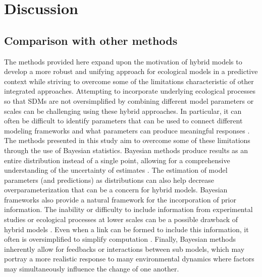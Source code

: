 \documentclass[11pt]{article}
\begin{document}
\section*{Discussion}

\subsection*{Comparison with other methods}
The methods provided here expand upon the motivation of hybrid models to develop a more robust and unifying approach for ecological models in a predictive context while striving to overcome some of the limitations characteristic of other integrated approaches. 
Attempting to incorporate underlying ecological processes so that SDMs are not oversimplified by combining different model parameters or scales can be challenging using these hybrid approaches. 
In particular, it can often be difficult to identify parameters that can be used to connect different modeling frameworks and what parameters can produce meaningful responses \citep{Thuiller2013}. 
The methods presented in this study aim to overcome some of these limitations through the use of Bayesian statistics. 
Bayesian methods produce results as an entire distribution instead of a single point, allowing for a comprehensive understanding of the uncertainty of estimates \citep{Link2010}. 
The estimation of model parameters (and predictions) as distributions can also help decrease overparameterization that can be a concern for hybrid models. 
Bayesian frameworks also provide a natural framework for the incorporation of prior information. 
The inability or difficulty to include information from experimental studies or ecological processes at lower scales can be a possible drawback of hybrid models \citep{Thuiller2008, Smolik2010}. 
Even when a link can be formed to include this information, it often is oversimplified to simplify computation \citep{Gallien2010}. 
Finally, Bayesian methods inherently allow for feedbacks or interactions between sub models, which may portray a more realistic response to many environmental dynamics where factors may simultaneously influence the change of one another.
\end{document}
